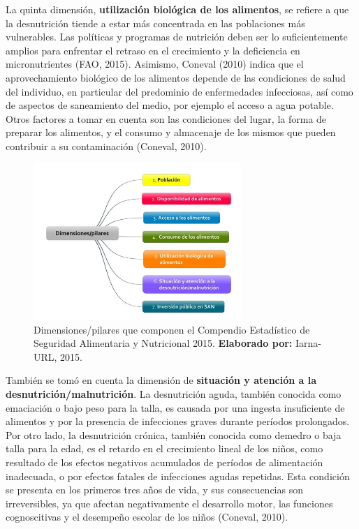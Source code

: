 La quinta dimensión, \textbf{utilización biológica de los alimentos}, se refiere a que la desnutrición tiende a estar más concentrada en las poblaciones más vulnerables. Las políticas y programas de nutrición deben ser lo suficientemente amplios para enfrentar el retraso en el crecimiento y la deficiencia en micronutrientes (FAO, 2015). Asimismo, Coneval (2010) indica que el aprovechamiento biológico de los alimentos depende de las condiciones de salud del individuo, en particular del predominio de enfermedades infecciosas, así como de aspectos de saneamiento del medio, por ejemplo el acceso a agua potable. Otros factores a tomar en cuenta son las condiciones del lugar, la forma de preparar los alimentos, y el consumo y almacenaje de los mismos que pueden contribuir a su contaminación (Coneval, 2010). 
\begin{figure}
	\centering
	\includegraphics[width=0.7\textwidth]{figura3}
	\caption{Dimensiones/pilares que componen el Compendio Estadístico de Seguridad Alimentaria y Nutricional 2015. \textbf{Elaborado por:} Iarna-URL, 2015.}
	\label{figura3}
\end{figure}
También se tomó en cuenta la dimensión de \textbf{situación y atención a la desnutrición/malnutrición}. La desnutrición aguda, también conocida como emaciación o bajo peso para la talla, es causada por una ingesta insuficiente de alimentos y por la presencia de infecciones graves durante períodos prolongados. Por otro lado, la desnutrición crónica, también conocida como demedro o baja talla para la edad, es el retardo en el crecimiento lineal de los niños, como resultado de los efectos negativos acumulados de períodos de alimentación inadecuada, o por efectos fatales de infecciones agudas repetidas. Esta condición se presenta en los primeros tres años de vida, y sus consecuencias son irreversibles, ya que afectan negativamente el desarrollo motor, las funciones cognoscitivas y el desempeño escolar de los niños (Coneval, 2010). 

